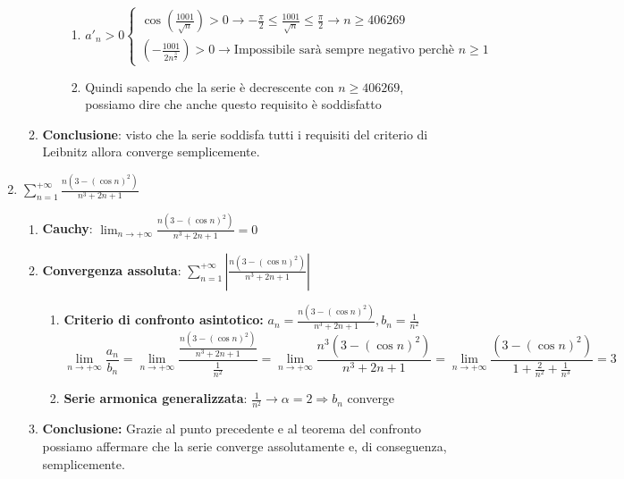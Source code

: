 \documentclass[10pt, a4paper]{article}
\begin{document}
\begin{enumerate}
\begin{enumerate}
\begin{enumerate}
\begin{enumerate}
                        \item $a'_n>0\begin{cases}
                                \cos\left(\frac{1001}{\sqrt{n}}\right)>0\rightarrow -\frac{\pi}{2}\leq\frac{1001}{\sqrt{n}}\leq\frac{\pi}{2}\rightarrow n \geq 406269\\
                                \left(-\frac{1001}{2n^{\frac{3}{2}}}\right)>0\rightarrow \text{Impossibile sarà sempre negativo perchè } n\geq 1
                            \end{cases}$
                        \item Quindi sapendo che la serie è decrescente con $n\geq 406269$, possiamo dire che anche questo requisito è soddisfatto
                    \end{enumerate}
                \end{enumerate}
                \item \textbf{Conclusione}: visto che la serie soddisfa tutti i requisiti del criterio di Leibnitz allora converge semplicemente.
            \end{enumerate}
            \item $\sum_{n=1}^{+\infty}\frac{n(3-(\cos n)^2)}{n^3+2n+1}$ \begin{enumerate}
                \item \textbf{Cauchy}: $\lim_{n\rightarrow+\infty}\frac{n(3-(\cos n)^2)}{n^3+2n+1}=0$
                \item \textbf{Convergenza assoluta}: $\sum_{n=1}^{+\infty}\left|\frac{n(3-(\cos n)^2)}{n^3+2n+1}\right|$ \begin{enumerate}
                    \item \textbf{Criterio di confronto asintotico:} $a_n=\frac{n(3-(\cos n)^2)}{n^3+2n+1}, b_n=\frac{1}{n^2}$
                    \begin{equation*}
                            \lim_{n\rightarrow+\infty}\frac{a_n}{b_n}=\lim_{n\rightarrow+\infty}\frac{\frac{n(3-(\cos n)^2)}{n^3+2n+1}}{\frac{1}{n^2}}=\lim_{n\rightarrow+\infty}\frac{n^3\left(3-(\cos n)^2\right)}{n^3+2n+1} = \lim_{n\rightarrow+\infty}\frac{\left(3-(\cos n)^2\right)}{1+\frac{2}{n^2}+\frac{1}{n^3}}=3
                    \end{equation*}
                    \item \textbf{Serie armonica generalizzata}: $\frac{1}{n^2}\rightarrow  \alpha=2\Rightarrow b_n$ converge
                \end{enumerate}
                \item \textbf{Conclusione:} Grazie al punto precedente e al teorema del confronto possiamo affermare che la serie converge assolutamente e, di conseguenza, semplicemente.

\end{enumerate}
\end{enumerate}
\end{document}
